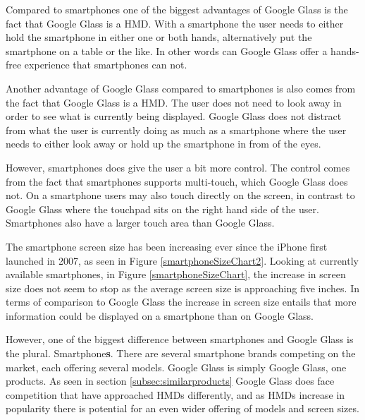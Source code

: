 Compared to smartphones one of the biggest advantages of Google Glass is the fact that Google Glass is a HMD. With a smartphone the user needs to either hold the smartphone in either one or both hands, alternatively put the smartphone on a table or the like. In other words can Google Glass offer a hands-free experience that smartphones can not.

Another advantage of Google Glass compared to smartphones is also comes from the fact that Google Glass is a HMD. The user does not need to look away in order to see what is currently being displayed. Google Glass does not distract from what the user is currently doing as much as a smartphone where the user needs to either look away or hold up the smartphone in from of the eyes.

However, smartphones does give the user a bit more control. The control comes from the fact that smartphones supports multi-touch, which Google Glass does not. On a smartphone users may also touch directly on the screen, in contrast to Google Glass where the touchpad sits on the right hand side of the user. Smartphones also have a larger touch area than Google Glass.

The smartphone screen size has been increasing ever since the iPhone first launched in 2007, as seen in Figure \ref{smartphoneSizeChart2}. Looking at currently available smartphones, in Figure \ref{smartphoneSizeChart}, the increase in screen size does not seem to stop as the average screen size is approaching five inches. In terms of comparison to Google Glass the increase in screen size entails that more information could be displayed on a smartphone than on Google Glass.

However, one of the biggest difference between smartphones and Google Glass is the plural. Smartphone\textbf{s}. There are several smartphone brands competing on the market, each offering several models. Google Glass is simply Google Glass, one products. As seen in section \ref{subsec:similarproducts} Google Glass does face competition that have approached HMDs differently, and as HMDs increase in popularity there is potential for an even wider offering of models and screen sizes.


